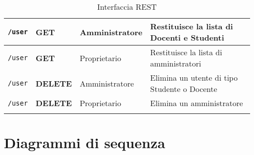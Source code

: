\documentclass[12pt,a4paper]{article}
\begin{document}
\begin{center}
\begin{longtable}[H]{p{} p{} p{} p{}}
		\midrule
		\midrule
		\texttt{/user} & \textbf{GET} & Amministratore & Restituisce la lista di Docenti e Studenti \\*
		\midrule
		\texttt{/user} & \textbf{GET} & Proprietario & Restituisce la lista di amministratori\\*
		\midrule
		\texttt{/user} & \textbf{DELETE} & Amministratore & Elimina un utente di tipo Studente o Docente \\*
		\midrule
		\texttt{/user} & \textbf{DELETE} & Proprietario & Elimina un amministratore \\*
		
		\bottomrule
		\caption{Interfaccia REST}
		\label{tab:intrest}
	\end{longtable}
\end{center}

\newpage
\section{Diagrammi di sequenza}
\end{document}
